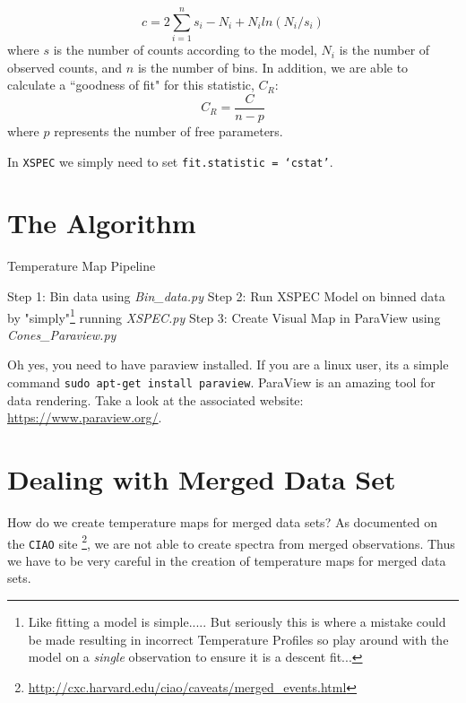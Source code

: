 \documentclass[11pt,letterpaper]{article}
\begin{document}
\begin{equation}
	c = 2\sum^{n}_{i=1}s_i-N_i+N_iln(N_i/s_i)
\end{equation}
where $s$ is the number of counts according to the model, $N_i$ is the number of observed counts, and $n$ is the number of bins. In addition, we are able to calculate a ``goodness of fit" for this statistic, $C_R$:
\begin{equation}
	C_R = \frac{C}{n-p}
\end{equation}
where $p$ represents the number of free parameters.

In \texttt{XSPEC} we simply need to set \texttt{fit.statistic = `cstat'}.
\newpage
\section{The Algorithm}

\begin{algorithm}[H]\label{algo:BA}
	\caption{Temperature Map Pipeline}
	Step 1: Bin data using \textit{Bin\_data.py} \;
	Step 2: Run XSPEC Model on binned data by "simply"\footnote{Like fitting a model is simple..... But seriously this is where a mistake could be made resulting in incorrect Temperature Profiles so play around with the model on a \textit{single} observation to ensure it is a descent fit...} running \textit{XSPEC.py} \;
	Step 3: Create Visual Map in ParaView using \textit{Cones\_Paraview.py} \;
\end{algorithm}

Oh yes, you need to have paraview installed. If you are a linux user, its a simple command \texttt{sudo apt-get install paraview}. ParaView is an amazing tool for data rendering. Take a look at the associated website: \href{https://www.paraview.org/}{https://www.paraview.org/}.


\newpage
\section{Dealing with Merged Data Set}
How do we create temperature maps for merged data sets? As documented on the \texttt{CIAO} site \footnote{\href{http://cxc.harvard.edu/ciao/caveats/merged_events.html}{http://cxc.harvard.edu/ciao/caveats/merged\_events.html}}, we are not able to create spectra from merged observations. Thus we have to be very careful in the creation of 
temperature maps for merged data sets. 
\end{document}
